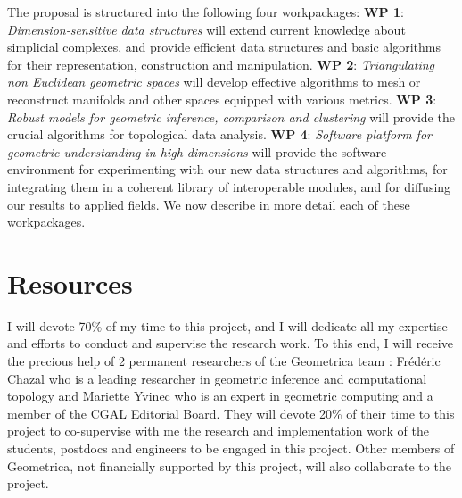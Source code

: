 The proposal is structured into the following four workpackages:
{\bf WP 1}:  {\em Dimension-sensitive data  structures} will extend current knowledge about simplicial complexes, and  provide efficient data structures and basic algorithms for their representation, construction and manipulation. 
  {\bf WP 2}:  {\em Triangulating non Euclidean geometric spaces} will develop effective algorithms to mesh or reconstruct manifolds and other spaces equipped with various metrics.   {\bf WP 3}: {\em Robust models for geometric inference, comparison and  clustering} will provide the crucial  algorithms for topological data analysis.
 {\bf WP 4}:  {\em  Software platform for geometric understanding in high dimensions} will provide the software environment for experimenting with our new data structures and algorithms, for integrating them in a coherent library of interoperable modules, and for diffusing our results to applied fields. We now describe in more detail each of these workpackages.











\section{Resources}

I will devote 70\% of my time to this project, and I will dedicate all my expertise and efforts to conduct and supervise the research work. To this end, I will receive the precious help of 2 permanent researchers of the Geometrica team : Fr\'ed\'eric Chazal who is a  leading researcher in geometric inference and computational topology and Mariette Yvinec who is an expert in geometric computing and a member of the CGAL Editorial Board. They will devote 20\% of their time to this project to co-supervise with me the research and implementation work of the students, postdocs and engineers to be engaged in this project. Other members of Geometrica,
not financially supported by this project, will also collaborate to the project.

